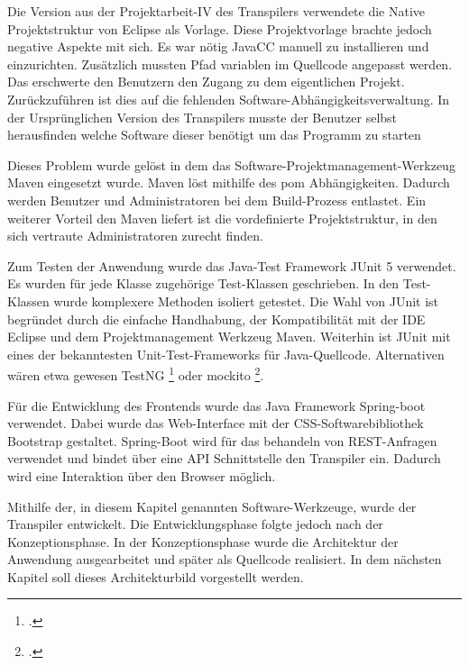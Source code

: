 Die Version aus der Projektarbeit-IV des Transpilers verwendete die Native Projektstruktur von Eclipse als Vorlage. Diese Projektvorlage brachte jedoch negative Aspekte mit sich. Es war nötig JavaCC manuell zu installieren und einzurichten. Zusätzlich mussten Pfad variablen im Quellcode angepasst werden. 
Das erschwerte den Benutzern den Zugang zu dem eigentlichen Projekt.
Zurückzuführen ist dies auf die fehlenden Software-Abhängigkeitsverwaltung. In der Ursprünglichen Version des Transpilers musste der Benutzer selbst herausfinden welche Software dieser benötigt um das Programm zu starten

Dieses Problem wurde gelöst in dem das Software-Projektmanagement-Werkzeug Maven eingesetzt wurde. Maven löst mithilfe des \ac{pom} Abhängigkeiten. 
Dadurch werden Benutzer und Administratoren bei dem Build-Prozess entlastet.
Ein weiterer Vorteil den Maven liefert ist die vordefinierte Projektstruktur, in den sich vertraute Administratoren zurecht finden.

Zum Testen der Anwendung wurde das Java-Test Framework JUnit 5 verwendet. Es wurden für jede Klasse zugehörige Test-Klassen geschrieben. In den Test-Klassen wurde komplexere Methoden isoliert getestet.
Die Wahl von JUnit ist begründet durch die einfache Handhabung, der Kompatibilität mit der IDE Eclipse und dem Projektmanagement Werkzeug Maven. Weiterhin ist JUnit mit eines der bekanntesten Unit-Test-Frameworks für Java-Quellcode. Alternativen wären etwa gewesen TestNG \footcite[Vgl. ][]{testng} oder mockito \footcite[Vgl. ][]{mockito}.

Für die Entwicklung des Frontends wurde das Java Framework Spring-boot verwendet.
Dabei wurde das Web-Interface mit der CSS-Softwarebibliothek Bootstrap gestaltet.
Spring-Boot wird für das behandeln von REST-Anfragen verwendet und bindet über eine API Schnittstelle den Transpiler ein.
Dadurch wird eine Interaktion über den Browser möglich.

Mithilfe der, in diesem Kapitel genannten Software-Werkzeuge, wurde der Transpiler entwickelt. Die Entwicklungsphase folgte jedoch nach der Konzeptionsphase.
In der Konzeptionsphase wurde die Architektur der Anwendung ausgearbeitet und später als Quellcode realisiert. 
In dem nächsten Kapitel soll dieses Architekturbild vorgestellt werden.

\pagebreak
